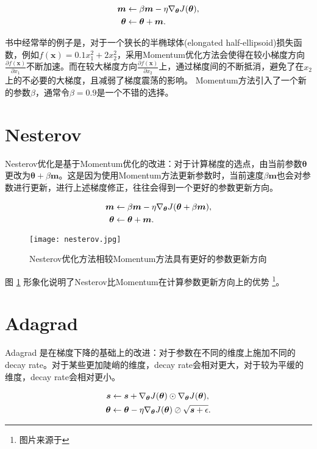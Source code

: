 \documentclass[lang=cn,newtx,10pt,scheme=chinese,color=black]{elegantbook}
\begin{document}
\begin{align}
  \label{momentum}
  \bm{m} &\leftarrow \beta\bm{m} - \eta\nabla_{\bm{\theta}}{J(\bm{\theta})},\\
  \bm{\theta} &\leftarrow \bm{\theta} + \bm{m}. \notag
\end{align}

书中经常举的例子是，对于一个狭长的半椭球体(elongated half-ellipsoid)损失函数，例如$f(\bm{x})=0.1x_{1}^{2}+2x_2^2$，采用Momentum优化方法会使得在较小梯度方向$\frac{\partial f(\bm{x})}{\partial x_1}$不断加速。而在较大梯度方向$\frac{\partial f(\bm{x})}{\partial x_2}$上，通过梯度间的不断抵消，避免了在$x_2$上的不必要的大梯度，且减弱了梯度震荡的影响。
Momentum方法引入了一个新的参数$\beta$，通常令$\beta = 0.9$是一个不错的选择。

\section{Nesterov}

Nesterov优化是基于Momentum优化的改进：对于计算梯度的选点，由当前参数$\bm{\theta}$更改为$\bm{\theta}+\beta\bm{m}$。这是因为使用Momentum方法更新参数时，当前速度$\beta\bm{m}$也会对参数进行更新，进行上述梯度修正，往往会得到一个更好的参数更新方向。

\begin{align}
  \label{nesterov}
  \bm{m} &\leftarrow \beta\bm{m} - \eta\nabla_{\bm{\theta}}{J(\bm{\theta}+\beta\bm{m})},\\
  \bm{\theta} &\leftarrow \bm{\theta} + \bm{m}. \notag
\end{align}

\begin{figure}[htbp]
  \centering
  \texttt{[image: nesterov.jpg]}
  \caption{Nesterov优化方法相较Momentum方法具有更好的参数更新方向 \label{fig:nesterov}}
\end{figure}

图 \ref{fig:nesterov} 形象化说明了Nesterov比Momentum在计算参数更新方向上的优势\cite{geron2022hands} \footnote{图片来源于\cite{geron2022hands}}。


\section{Adagrad}

Adagrad 是在梯度下降的基础上的改进：对于参数在不同的维度上施加不同的decay rate。对于某些更加陡峭的维度，decay rate会相对更大，对于较为平缓的维度，decay rate会相对更小。

\begin{align}
  \label{adagrad}
  \bm{s} &\leftarrow \bm{s} + \nabla_{\bm{\theta}}{J(\bm{\theta})} \odot \nabla_{\bm{\theta}}{J(\bm{\theta})},\\
  \bm{\theta} &\leftarrow \bm{\theta} - \eta\nabla_{\bm{\theta}}{J(\bm{\theta})} \oslash \sqrt{\bm{s} + \epsilon} . \notag
\end{align}
\end{document}
